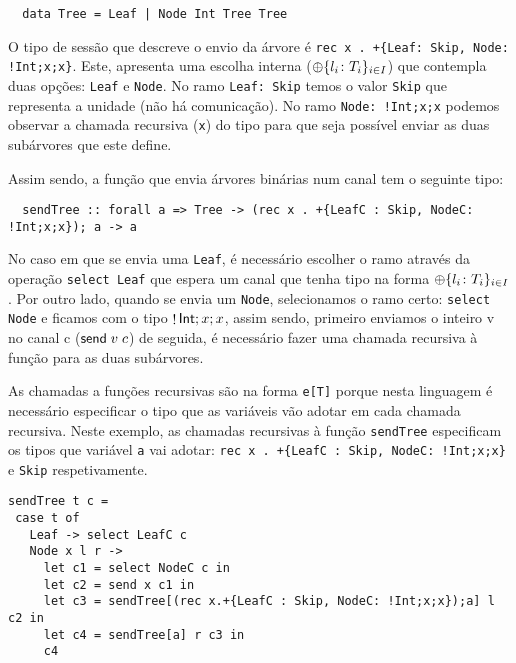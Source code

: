 \begin{lstlisting}
  data Tree = Leaf | Node Int Tree Tree
\end{lstlisting}

O tipo de sessão que descreve o envio da árvore é \lstinline"rec x . +{Leaf: Skip, Node: !Int;x;x}". Este, apresenta uma escolha interna ($\oplus\{l_i\colon T_i\}_{i\in I}$) que contempla duas opções: \lstinline"Leaf" e \lstinline"Node". No ramo \lstinline"Leaf: Skip" temos o valor \lstinline"Skip" que representa a unidade (não há comunicação). No ramo \lstinline"Node: !Int;x;x" podemos observar a chamada recursiva (\lstinline"x") do tipo para que seja possível enviar as duas subárvores que este define.

Assim sendo, a função que envia árvores binárias num canal tem o seguinte tipo:

\begin{lstlisting}
  sendTree :: forall a => Tree -> (rec x . +{LeafC : Skip, NodeC: !Int;x;x}); a -> a
\end{lstlisting}


No caso em que se envia uma \lstinline"Leaf", é necessário escolher o ramo através da operação \lstinline"select Leaf" que espera um canal que tenha tipo na forma $\oplus\{l_i\colon T_i\}_{i\in I}$.
Por outro lado, quando se envia um \lstinline"Node", selecionamos o ramo certo: \lstinline"select Node" e ficamos com o tipo $\mathop!\mathsf{Int};x;x$, assim sendo, primeiro enviamos o inteiro v no canal c ($\mathsf{send}\;v\; c$) de seguida, é necessário fazer uma chamada recursiva à função para as duas subárvores.

As chamadas a funções recursivas são na forma \lstinline"e[T]" porque nesta linguagem é necessário especificar o tipo que as variáveis vão adotar em cada chamada recursiva.
Neste exemplo, as chamadas recursivas à função \lstinline"sendTree" especificam os tipos que variável \lstinline"a" vai adotar: \lstinline"rec x . +{LeafC : Skip, NodeC: !Int;x;x}" e \lstinline"Skip" respetivamente.

\begin{lstlisting}
sendTree t c =
 case t of
   Leaf -> select LeafC c
   Node x l r ->
     let c1 = select NodeC c in
     let c2 = send x c1 in
     let c3 = sendTree[(rec x.+{LeafC : Skip, NodeC: !Int;x;x});a] l c2 in
     let c4 = sendTree[a] r c3 in
     c4

\end{lstlisting}

